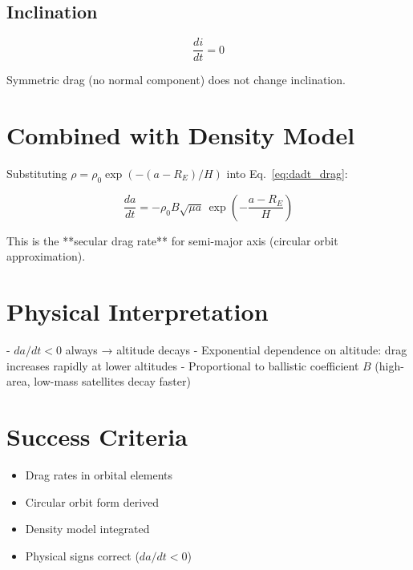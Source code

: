 \documentclass[11pt]{article}
\begin{document}
\subsection{Inclination}
\begin{equation}
\boxed{\frac{di}{dt} = 0}
\end{equation}

Symmetric drag (no normal component) does not change inclination.

\section{Combined with Density Model}

Substituting $\rho = \rho_0 \exp(-(a - R_E)/H)$ into Eq.~\eqref{eq:dadt_drag}:

\begin{equation}
\boxed{\frac{da}{dt} = -\rho_0 B\sqrt{\mu a}\,\exp\left(-\frac{a - R_E}{H}\right)}
\label{eq:dadt_full}
\end{equation}

This is the **secular drag rate** for semi-major axis (circular orbit approximation).

\section{Physical Interpretation}

- $da/dt < 0$ always → altitude decays
- Exponential dependence on altitude: drag increases rapidly at lower altitudes
- Proportional to ballistic coefficient $B$ (high-area, low-mass satellites decay faster)

\section{Success Criteria}
\begin{itemize}
    \item[$\checkmark$] Drag rates in orbital elements
    \item[$\checkmark$] Circular orbit form derived
    \item[$\checkmark$] Density model integrated
    \item[$\checkmark$] Physical signs correct ($da/dt < 0$)
\end{itemize}
\end{document}
